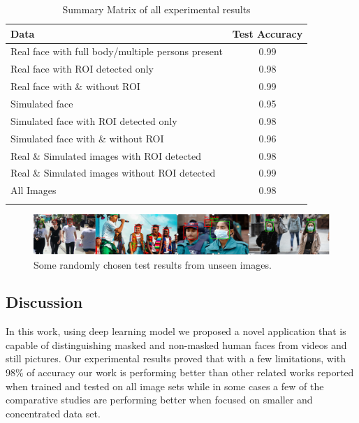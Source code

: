 \documentclass{svproc}
\begin{document}
\begin{table}[]
\centering
\begin{tabular}{lc}
\hline
Data & Test Accuracy \\
\hline
Real face with full body/multiple persons present & 0.99 \\
Real face with ROI detected only                       & 0.98 \\
Real face with \& without ROI                      & 0.99 \\
Simulated face                  & 0.95 \\
Simulated face with ROI detected  only            & 0.98 \\
Simulated face with \& without ROI       & 0.96 \\
Real \& Simulated images with ROI detected           & 0.98 \\
Real \& Simulated images without ROI detected                 & 0.99 \\
All Images                         & 0.98 \\
\hline \\
\end{tabular}
\caption{Summary Matrix of all experimental results}
\label{expResult}
\vspace{-6mm}
\end{table}

\begin{figure}[!ht]
\includegraphics[width=1\textwidth]{test_image.PNG}
\centering
\caption{Some randomly chosen test results from unseen images.}
\label{testresult}
\vspace{-6mm}
\end{figure}

\subsection{Discussion}

In this work, using deep learning model we proposed a novel application that is capable of distinguishing masked and non-masked human faces from videos and still pictures. Our experimental results proved that with a few limitations, with $98\%$ of accuracy our work is performing better than other related works reported when trained and tested on all image sets while in some cases a few of the comparative studies are performing better when focused on smaller and concentrated data set. 
\end{document}
